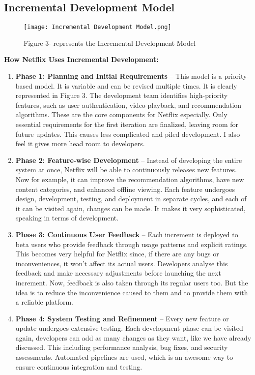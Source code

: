 \documentclass[a4paper,10pt,twoside]{article}
\begin{document}
\subsection{Incremental Development Model}
\begin{figure}[tbhp]
\centering
\texttt{[image: Incremental Development Model.png]}
\caption{Figure 3- represents the Incremental Development Model}
\label{fig:incremental}
\end{figure}
\textbf{How Netflix Uses Incremental Development:}
\begin{enumerate}
    \item \textbf{Phase 1: Planning and Initial Requirements} – This model is a priority-based model. It is variable and can be revised multiple times. It is clearly represented in Figure 3. The development team identifies high-priority features, such as user authentication, video playback, and recommendation algorithms. These are the core components for Netflix especially. Only essential requirements for the first iteration are finalized, leaving room for future updates. This causes less complicated and piled development. I also feel it gives more head room to developers. 
    \item \textbf{Phase 2: Feature-wise Development} – Instead of developing the entire system at once, Netflix will be able to continuously releases new features. Now for example, it can improve the recommendation algorithms, have new content categories, and enhanced offline viewing. Each feature undergoes design, development, testing, and deployment in separate cycles, and each of it can be visited again, changes can be made. It makes it very sophisticated, speaking in terms of development.
    \item \textbf{Phase 3: Continuous User Feedback} – Each increment is deployed to beta users who provide feedback through usage patterns and explicit ratings. This becomes very helpful for Netflix since, if there are any bugs or inconveniences, it won’t affect its actual users. Developers analyse this feedback and make necessary adjustments before launching the next increment. Now, feedback is also taken through its regular users too. But the idea is to reduce the inconvenience caused to them and to provide them with a reliable platform.
    \item \textbf{Phase 4: System Testing and Refinement} – Every new feature or update undergoes extensive testing. Each development phase can be visited again, developers can add as many changes as they want, like we have already discussed. This including performance analysis, bug fixes, and security assessments. Automated pipelines are used, which is an awesome way to ensure continuous integration and testing.

\end{enumerate}
\end{document}

